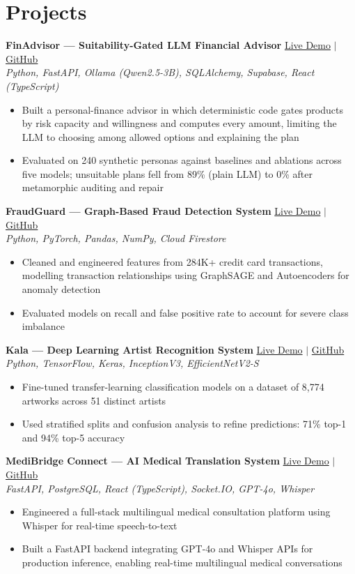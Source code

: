 \documentclass[11pt,a4paper]{article}
\begin{document}
\section{Projects}
\vspace{1pt}
\textbf{FinAdvisor — Suitability-Gated LLM Financial Advisor}
\hfill \href{https://finadvisor-india.vercel.app/}{Live Demo} $\vert$ \href{https://github.com/b-rahul07/FinAdv}{GitHub}\\
\textit{Python, FastAPI, Ollama (Qwen2.5-3B), SQLAlchemy, Supabase, React (TypeScript)}
\begin{itemize}
\item Built a personal-finance advisor in which deterministic code gates products by risk capacity and willingness and computes every amount, limiting the LLM to choosing among allowed options and explaining the plan
\item Evaluated on 240 synthetic personas against baselines and ablations across five models; unsuitable plans fell from 89\% (plain LLM) to 0\% after metamorphic auditing and repair
\end{itemize}
\textbf{FraudGuard — Graph-Based Fraud Detection System}
\hfill \href{https://fraud-gaurd-mu.vercel.app/}{Live Demo} $\vert$ \href{https://github.com/b-rahul07/Fraud-Gaurd}{GitHub}\\
\textit{Python, PyTorch, Pandas, NumPy, Cloud Firestore}
\begin{itemize}
\item Cleaned and engineered features from 284K+ credit card transactions, modelling transaction relationships using GraphSAGE and Autoencoders for anomaly detection
\item Evaluated models on recall and false positive rate to account for severe class imbalance
\end{itemize}
\textbf{Kala — Deep Learning Artist Recognition System}
\hfill \href{https://kala-art-ai.vercel.app/}{Live Demo} $\vert$ \href{https://github.com/b-rahul07/kala-art-ai}{GitHub}\\
\textit{Python, TensorFlow, Keras, InceptionV3, EfficientNetV2-S}
\begin{itemize}
\item Fine-tuned transfer-learning classification models on a dataset of 8,774 artworks across 51 distinct artists
\item Used stratified splits and confusion analysis to refine predictions: 71\% top-1 and 94\% top-5 accuracy
\end{itemize}
\textbf{MediBridge Connect — AI Medical Translation System}
\hfill \href{https://medibridge-connect.vercel.app/}{Live Demo} $\vert$ \href{https://github.com/b-rahul07/medibridge-connect}{GitHub}\\
\textit{FastAPI, PostgreSQL, React (TypeScript), Socket.IO, GPT-4o, Whisper}
\begin{itemize}
\item Engineered a full-stack multilingual medical consultation platform using Whisper for real-time speech-to-text
\item Built a FastAPI backend integrating GPT-4o and Whisper APIs for production inference, enabling real-time multilingual medical conversations
\end{itemize}
\end{document}
